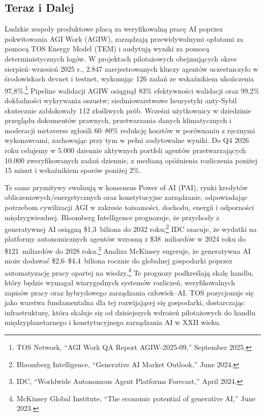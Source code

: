 \documentclass[11pt]{article}
\begin{document}
\subsection{Teraz i Dalej}
\begin{description}[leftmargin=2.1cm, style=nextline]
  \item[12--24 Miesiące] Ludzkie zespoły produktowe płacą za weryfikowalną pracę AI poprzez pokwitowania AGI Work (AGIW), zarządzają przewidywalnymi opłatami za pomocą TOS Energy Model (TEM) i audytują wyniki za pomocą deterministycznych logów. W projektach pilotażowych obejmujących okres sierpień--wrzesień 2025 r., 2.847 zarejestrowanych kluczy agentów uczestniczyło w środowiskach devnet i testnet, wykonując 126 zadań ze wskaźnikiem ukończenia 97,8\%.\footnote{TOS Network, ``AGI Work QA Report AGIW-2025-09,'' September 2025.} Pipeline walidacji AGIW osiągnął 83\% efektywności walidacji oraz 99,2\% dokładności wykrywania oszustw; siedmiowarstwowe heurystyki anty-Sybil skutecznie zablokowały 112 złośliwych prób. Wcześni użytkownicy w dziedzinie przeglądu dokumentów prawnych, przetwarzania danych klimatycznych i moderacji metaverse zgłosili 60--80\% redukcję kosztów w porównaniu z ręcznymi wykonawcami, zachowując przy tym w pełni audytowalne wyniki. Do Q4 2026 roku celujemy w 5.000 dziennie aktywnych portfeli agentów przetwarzających 10.000 zweryfikowanych zadań dziennie, z medianą opóźnienia rozliczenia poniżej 15 minut i wskaźnikiem sporów poniżej 2\%.

  \item[100-letni Łuk] Te same prymitywy ewoluują w konsensus Power of AI (PAI), rynki kredytów obliczeniowych/energetycznych oraz konstytucyjne zarządzanie, odpowiadając potrzebom cywilizacji AGI w zakresie tożsamości, dochodu, energii i odporności międzygwiezdnej. Bloomberg Intelligence prognozuje, że przychody z generatywnej AI osiągną \$1,3~biliona do 2032 roku;\footnote{Bloomberg Intelligence, ``Generative AI Market Outlook,'' June 2024.} IDC szacuje, że wydatki na platformy autonomicznych agentów wzrosną z \$38~miliardów w 2024 roku do \$121~miliardów do 2028 roku.\footnote{IDC, ``Worldwide Autonomous Agent Platforms Forecast,'' April 2024.} Analiza McKinsey sugeruje, że generatywna AI może dodawać \$2,6--\$4,4~biliona rocznie do globalnej gospodarki poprzez automatyzację pracy opartej na wiedzy.\footnote{McKinsey Global Institute, ``The economic potential of generative AI,'' June 2023.} Te prognozy podkreślają skalę handlu, który będzie wymagał wiarygodnych systemów rozliczeń, weryfikowalnych zapisów pracy oraz hybrydowego zarządzania człowiek--AI. TOS pozycjonuje się jako warstwa fundamentalna dla tej rozwijającej się gospodarki, dostarczając infrastrukturę, która skaluje się od dzisiejszych wdrożeń pilotażowych do handlu międzyplanetarnego i konstytucyjnego zarządzania AI w XXII wieku.
\end{description}
\end{document}
